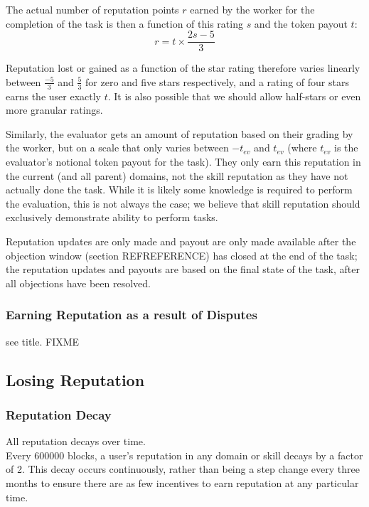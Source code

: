 The actual number of reputation points $r$ earned by the worker for the completion of the task is then a function of this rating $s$ and the token payout $t$:
\begin{equation}\label{eq:stars-to-rep}
 r = t \times \frac{2s - 5}{3} 
\end{equation}
 
Reputation lost or gained as a function of the star rating therefore varies linearly between $\frac{-5}{3}$ and $\frac{5}{3}$ for zero and five stars respectively, and a rating of four stars earns the user exactly $t$. It is also possible that we should allow half-stars or even more granular ratings.

Similarly, the evaluator gets an amount of reputation based on their grading by the worker, but on a scale that only varies between $-t_{ev}$ and $t_{ev}$ (where $t_{ev}$ is the evaluator’s notional token payout for the task). They only earn this reputation in the current (and all parent) domains, not the skill reputation as they have not actually done the task. While it is likely some knowledge is required to perform the evaluation, this is not always the case; we believe that skill reputation should exclusively demonstrate ability to perform tasks.

Reputation updates are only made and payout are only made available after the objection window (section REFREFERENCE) has closed at the end of the task; the reputation updates and payouts are based on the final state of the task, after all objections have been resolved.

\subsubsection{Earning Reputation as a result of Disputes}\label{sec:earning-rep-in-disputes}
see title. FIXME



\subsection{Losing Reputation}\label{sec:losing-rep}

\subsubsection{Reputation Decay}
All reputation decays over time.\\
Every 600000 blocks, a user’s reputation in any domain or skill decays by a factor of 2. This decay occurs continuously, rather than being a step change every three months to ensure there are as few incentives to earn reputation at any particular time.

